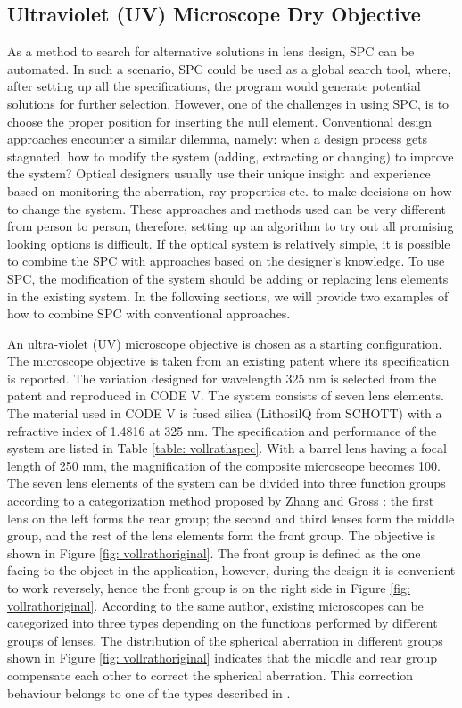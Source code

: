 \subsection{Ultraviolet (UV) Microscope Dry Objective}
As a method to search for alternative solutions in lens design, SPC can be automated. In such a scenario, SPC could be used as a global search tool, where, after setting up all the specifications, the program would generate potential solutions for further selection. However, one of the challenges in using SPC, is to choose the proper position for inserting the null element. Conventional design approaches encounter a similar dilemma, namely: when a design process gets stagnated, how to modify the system (adding, extracting or changing) to improve the system? Optical designers usually use their unique insight and experience based on monitoring the aberration, ray properties etc. to make decisions on how to change the system. These approaches and methods used can be very different from person to person, therefore, setting up an algorithm to try out all promising looking options is difficult. If the optical system is relatively simple, it is possible to combine the SPC with approaches based on the designer's knowledge. To use SPC, the modification of the system should be adding or replacing lens elements in the existing system. In the following sections, we will provide two examples of how to combine SPC with conventional approaches. 

An ultra-violet (UV) microscope objective is chosen as a starting configuration. The microscope objective is taken from an existing patent\cite{patentvollrath} where its specification is reported. The variation designed for wavelength 325 nm is selected from the patent and reproduced in CODE V. The system consists of seven lens elements. The material used in CODE V is fused silica (LithosilQ from SCHOTT) with a refractive index of 1.4816 at 325 nm. The specification and performance of the system are listed in Table \ref{table: vollrathspec}. With a barrel lens having a focal length of 250 mm, the magnification of the composite microscope becomes 100. The seven lens elements of the system can be divided into three function groups according to a categorization method proposed by Zhang and Gross \cite{ZhangMicroscope2017}: the first lens on the left forms the rear group; the second and third lenses form the middle group, and the rest of the lens elements form the front group. The objective is shown in Figure \ref{fig: vollrathoriginal}. The front group is defined as the one facing to the object in the application, however, during the design it is convenient to work reversely, hence the front group is on the right side in Figure \ref{fig: vollrathoriginal}. According to the same author, existing microscopes can be categorized into three types depending on the functions performed by different groups of lenses. The distribution of the spherical aberration in different groups shown in Figure \ref{fig: vollrathoriginal} indicates that the middle and rear group compensate each other to correct the spherical aberration. This correction behaviour belongs to one of the types described in \cite{ZhangMicroscope2017}.

